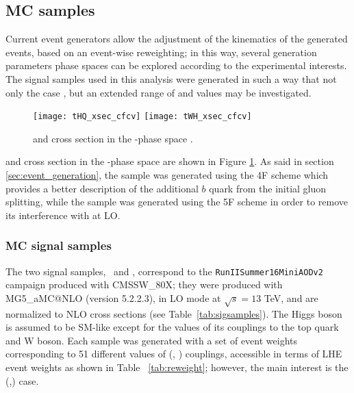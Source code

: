 \subsection{MC samples}

Current event generators allow the adjustment of the kinematics of the generated events, based on an event-wise reweighting; in this way, several generation parameters phase spaces can be explored according to the experimental interests. The signal samples used in this analysis were generated in such a way that not only the case , but an extended range of \Ct and \CV values may be investigated.

\begin{figure}[htp]
\centering
\texttt{[image: tHQ\_xsec\_cfcv]}
\texttt{[image: tWH\_xsec\_cfcv]} 
\caption[\tHq and \tHW cross section in the \Ct-\CV phase space]{\tHq and \tHW cross section in the \Ct-\CV phase space \cite{THQProdTwiki}.}
\label{fig:ktkv_phase_space}
\end{figure}

\tHq and \tHW cross section in the \Ct-\CV phase space are shown in Figure \ref{fig:ktkv_phase_space}. As said in section \ref{sec:event_generation}, the \tHq sample was generated using the 4F scheme which provides a better description of the additional $b$ quark from the initial gluon splitting, while the \tHW sample was generated using the 5F scheme in order to remove its interference with \ttH at LO.


\subsubsection*{MC signal samples}\label{ssec:mc_signal}

The two signal samples, \tHq\ and \tHW, correspond to the \verb|RunIISummer16MiniAODv2| campaign produced with CMSSW\_80X; they were produced with \textsc{MG5\_}a\textsc{MC@NLO} (version 5.2.2.3), in LO mode at $\sqrt{s}=13$ TeV, and are normalized to NLO cross sections (see Table~\ref{tab:sigsamples}). The Higgs boson is assumed to be SM-like except for the values of its couplings to the top quark and W boson. Each sample was generated with a set of event weights corresponding to 51 different values of (\Ct, \CV) couplings, accessible in terms of LHE event weights as shown in Table ~\ref{tab:reweight}; however, the main interest is the (,) case. 

